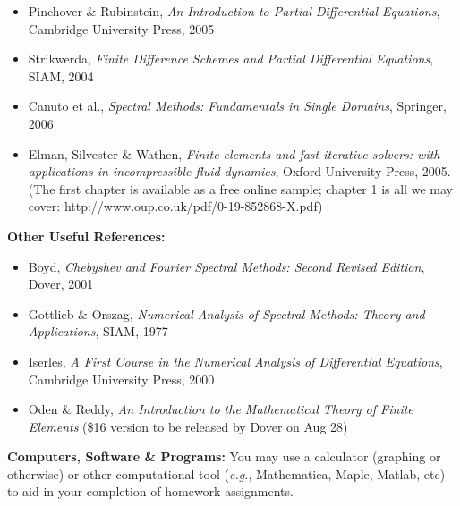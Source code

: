 \documentclass{article}
\begin{document}
\vspace{-0.1in}
\begin{itemize}

 \item Pinchover \& Rubinstein, \textit{An Introduction to Partial
Differential Equations}, Cambridge University Press, 2005

  \item Strikwerda, \textit{Finite Difference Schemes and Partial
Differential Equations}, SIAM, 2004

\item Canuto et al., \textit{Spectral Methods: Fundamentals in Single
Domains}, Springer, 2006

\item Elman, Silvester \& Wathen, \textit{Finite elements and fast iterative
solvers: with applications in incompressible fluid dynamics}, Oxford
University Press, 2005.  (The first chapter is available as a free online
sample; chapter 1 is all we may cover:
http://www.oup.co.uk/pdf/0-19-852868-X.pdf)

\end{itemize}

\clearpage
\textbf{Other Useful References:} 

\vspace{-0.1in}
\begin{itemize}

  \item Boyd, \textit{Chebyshev and Fourier Spectral Methods: Second Revised
Edition}, Dover, 2001

  \item Gottlieb \& Orszag, \textit{Numerical Analysis of Spectral Methods:
Theory and Applications}, SIAM, 1977

 \item Iserles, \textit{A First Course in the Numerical Analysis of
Differential Equations}, Cambridge University Press, 2000

 \item Oden \& Reddy, \textit{An Introduction to the Mathematical Theory of
Finite Elements} (\$16 version to be  
released by Dover on Aug 28)

\end{itemize}



\textbf{Computers, Software \& Programs:} You may use a calculator (graphing or
otherwise) or other computational tool (\textit{e.g.}, Mathematica, Maple,
Matlab, etc) to aid in your completion of homework assignments.  
\end{document}
